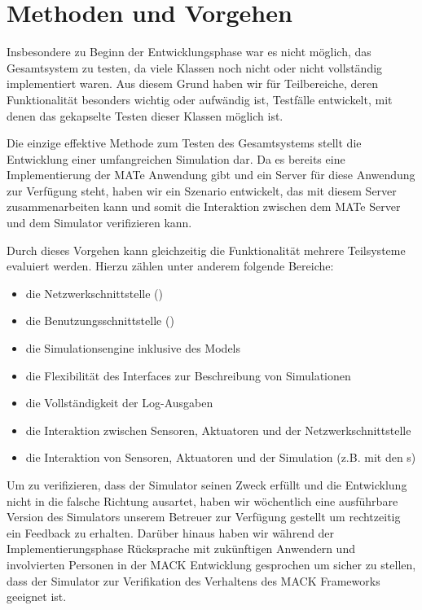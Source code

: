\section{Methoden und Vorgehen}\label{sec:eva_approach}
Insbesondere zu Beginn der Entwicklungsphase war es nicht möglich, das Gesamtsystem zu testen, da viele Klassen noch nicht oder nicht vollständig implementiert waren. Aus diesem Grund haben wir für Teilbereiche, deren Funktionalität besonders wichtig oder aufwändig ist, Testfälle entwickelt, mit denen das gekapselte Testen dieser Klassen möglich ist.

Die einzige effektive Methode zum Testen des Gesamtsystems stellt die Entwicklung einer umfangreichen Simulation dar. Da es bereits eine Implementierung der MATe Anwendung gibt und ein Server für diese Anwendung zur Verfügung steht, haben wir ein Szenario entwickelt, das mit diesem Server zusammenarbeiten kann und somit die Interaktion zwischen dem MATe Server und dem Simulator verifizieren kann.

Durch dieses Vorgehen kann gleichzeitig die Funktionalität mehrere Teilsysteme evaluiert werden. Hierzu zählen unter anderem folgende Bereiche:
\begin{itemize}
	\item die Netzwerkschnittstelle ()
	\item die Benutzungsschnittstelle ()
	\item die Simulationsengine inklusive des Models
	\item die Flexibilität des Interfaces zur Beschreibung von Simulationen
	\item die Vollständigkeit der Log-Ausgaben
	\item die Interaktion zwischen Sensoren, Aktuatoren und der Netzwerkschnittstelle
	\item die Interaktion von Sensoren, Aktuatoren und der Simulation (z.B. mit den s)
\end{itemize}

Um zu verifizieren, dass der Simulator seinen Zweck erfüllt und die Entwicklung nicht in die falsche Richtung ausartet, haben wir wöchentlich eine ausführbare Version des Simulators unserem Betreuer zur Verfügung gestellt um rechtzeitig ein Feedback zu erhalten. Darüber hinaus haben wir während der Implementierungsphase Rücksprache mit zukünftigen Anwendern und involvierten Personen  in der MACK Entwicklung gesprochen um sicher zu stellen, dass der Simulator zur Verifikation des Verhaltens des MACK Frameworks geeignet ist.


